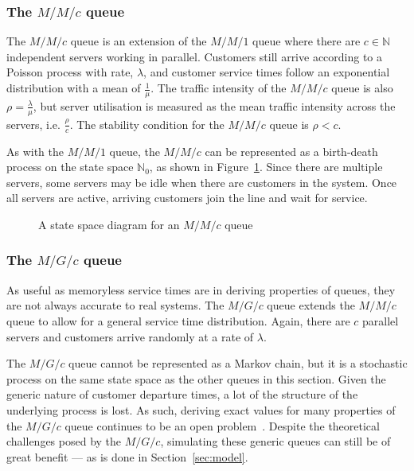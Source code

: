 \subsubsection{The \(M/M/c\) queue}

The \(M/M/c\) queue is an extension of the \(M/M/1\) queue where there are \(c
\in \mathbb N\) independent servers working in parallel. Customers still arrive
according to a Poisson process with rate, \(\lambda\), and customer service
times follow an exponential distribution with a mean of \(\frac{1}{\mu}\). The
traffic intensity of the \(M/M/c\) queue is also \(\rho = \frac{\lambda}{\mu}\),
but server utilisation is measured as the mean traffic intensity across the
servers, i.e.  \(\frac{\rho}{c}\). The stability condition for the \(M/M/c\)
queue is \(\rho < c\). 

As with the \(M/M/1\) queue, the \(M/M/c\) can be represented as a birth-death
process on the state space \(\mathbb N_0\), as shown in
Figure~\ref{fig:birth_death_mmc}. Since there are multiple servers, some servers
may be idle when there are customers in the system. Once all servers are active,
arriving customers join the line and wait for service. 

\begin{figure}[htbp]
    \centering
    \resizebox{\imgwidth}{!}{%
        
    }\caption{
        A state space diagram for an \(M/M/c\) queue%
    }\label{fig:birth_death_mmc}
\end{figure}

\subsubsection{The \(M/G/c\) queue}

As useful as memoryless service times are in deriving properties of queues, they
are not always accurate to real systems. The \(M/G/c\) queue extends the
\(M/M/c\) queue to allow for a general service time distribution. Again, there
are \(c\) parallel servers and customers arrive randomly at a rate of
\(\lambda\).

The \(M/G/c\) queue cannot be represented as a Markov chain, but it is a
stochastic process on the same state space as the other queues in this section.
Given the generic nature of customer departure times, a lot of the structure of
the underlying process is lost. As such, deriving exact values for many
properties of the \(M/G/c\) queue continues to be an open
problem~\cite{Kingman2009}. Despite the theoretical challenges posed by the
\(M/G/c\), simulating these generic queues can still be of great benefit --- as
is done in Section~\ref{sec:model}. 

